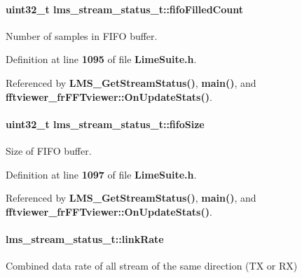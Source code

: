 \paragraph[{fifo\+Filled\+Count}]{\setlength{\rightskip}{0pt plus 5cm}uint32\+\_\+t lms\+\_\+stream\+\_\+status\+\_\+t\+::fifo\+Filled\+Count}\label{structlms__stream__status__t_a2274f194fc8cd8bd25798c8f9bc66cf9}


Number of samples in F\+I\+FO buffer. 



Definition at line {\bf 1095} of file {\bf Lime\+Suite.\+h}.



Referenced by {\bf L\+M\+S\+\_\+\+Get\+Stream\+Status()}, {\bf main()}, and {\bf fftviewer\+\_\+fr\+F\+F\+Tviewer\+::\+On\+Update\+Stats()}.

\paragraph[{fifo\+Size}]{\setlength{\rightskip}{0pt plus 5cm}uint32\+\_\+t lms\+\_\+stream\+\_\+status\+\_\+t\+::fifo\+Size}\label{structlms__stream__status__t_a627d844a6109861317a79ea398bb14c6}


Size of F\+I\+FO buffer. 



Definition at line {\bf 1097} of file {\bf Lime\+Suite.\+h}.



Referenced by {\bf L\+M\+S\+\_\+\+Get\+Stream\+Status()}, {\bf main()}, and {\bf fftviewer\+\_\+fr\+F\+F\+Tviewer\+::\+On\+Update\+Stats()}.

\paragraph[{link\+Rate}]{ lms\+\_\+stream\+\_\+status\+\_\+t\+::link\+Rate}\label{structlms__stream__status__t_adb51f3b1f1b589fbf949295ffeae62e6}


Combined data rate of all stream of the same direction (TX or RX) 



